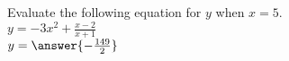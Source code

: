 \documentclass{ximera}
\author{David Kish}
\begin{document}
\begin{exercise}
Evaluate the following equation for $y$ when $x=5$.\\
$y= -3x^2+ \frac{x-2}{x+1}$\\
$y=\answer{-\frac{149}{2}}$
\end{exercise}
\end{document}
